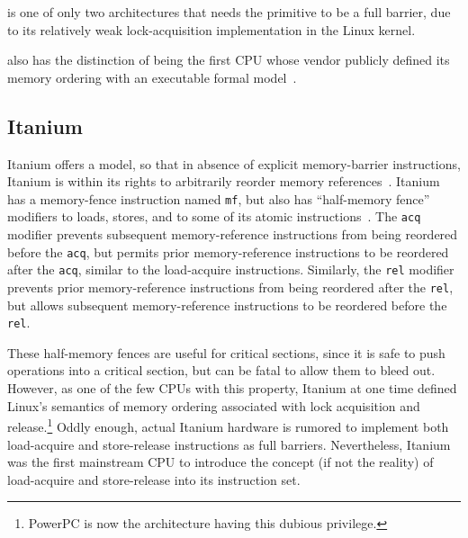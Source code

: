  is one of only two architectures that needs the
 primitive to be a full barrier,
due to its relatively weak lock-acquisition implementation in
the Linux kernel.

 also has the distinction of being the first CPU whose vendor publicly
defined its memory ordering with an executable formal model~\cite{ARMv8A:2017}.

\subsection{Itanium}
\label{sec:memorder:Itanium}

Itanium offers a 
model, so that in absence of explicit
memory-barrier instructions, Itanium is within its rights to arbitrarily
reorder memory references~\cite{IntelItanium02v2}.
Itanium has a memory-fence instruction named {\tt mf}, but also has
``half-memory fence'' modifiers to loads, stores, and to some of its atomic
instructions~\cite{IntelItanium02v3}.
The {\tt acq} modifier prevents subsequent memory-reference instructions
from being reordered before the {\tt acq}, but permits
prior memory-reference instructions to be reordered after the {\tt acq},
similar to the  load-acquire instructions.
Similarly, the {\tt rel} modifier prevents prior memory-reference
instructions from being reordered after the {\tt rel}, but allows
subsequent memory-reference instructions to be reordered before
the {\tt rel}.

These half-memory fences are useful for critical sections, since
it is safe to push operations into a critical section, but can be
fatal to allow them to bleed out.
However, as one of the few CPUs with this property, Itanium at one
time defined Linux's semantics of memory ordering associated with lock
acquisition and release.\footnote{
	PowerPC is now the architecture having this dubious privilege.}
Oddly enough, actual Itanium hardware is rumored to implement
both load-acquire and store-release instructions as full barriers.
Nevertheless, Itanium was the first mainstream CPU to introduce the concept
(if not the reality) of load-acquire and store-release into its
instruction set.

